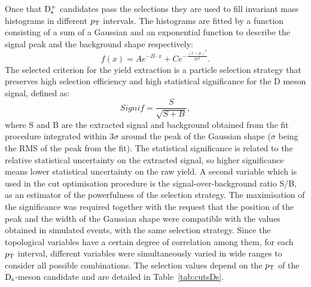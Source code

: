Once that ${\rm D_s^+}$ candidates pass the selections they are 
used to fill invariant mass histograms in different $p_{\rm T}$ intervals.
The histograms are fitted by a function consisting of a sum of 
a Gaussian and an exponential function to describe the signal peak and 
the background shape respectively:
\begin{equation}
f(x)= Ae^{-B\cdot x}+Ce^{-\frac{(x-\mu)^2}{2\sigma^2}}.
\end{equation}
The selected criterion for the yield extraction is a particle selection 
 strategy that preserves high selection efficiency and high statistical 
 significance for the D meson signal, defined as:
\[
Signif = \frac{S}{\sqrt{S+B}},
\]
where S and B are the extracted signal and background obtained 
from the fit procedure integrated within 3$\sigma$ 
around the peak of the Gaussian shape ($\sigma$ being the
RMS of the peak from the fit). The statistical significance is related to the 
relative statistical uncertainty on the extracted signal, so higher 
significance means lower statistical uncertainty on the raw yield. 
A second variable which is used in the cut optimisation procedure
 is the signal-over-background ratio S/B, as 
 an estimator of the powerfulness of the selection strategy. 
 The maximisation of the significance was required together
  with the request that the position of the peak and the width 
  of the Gaussian shape were compatible with the values
   obtained in simulated events, with the same selection strategy.
Since the topological variables have a certain degree of correlation among them, 
for each $p_{\rm T}$ interval, different variables 
were simultaneously varied in wide ranges to consider all possible combinations. 
The selection values depend on the $p_{\rm T}$ of the ${\rm D_s}$-meson candidate and 
are detailed in Table~\ref{tab:cutsDs}.
